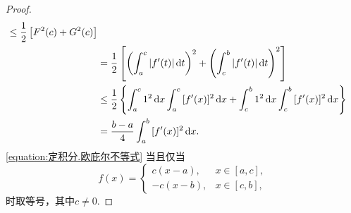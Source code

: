 \begin{theorem}[欧庇尔不等式]
\begin{proof}
\begin{align*}
	\leq \frac{1}{2} \left[
		F^2(c)
		+ G^2(c)
		\right] \\
	&= \frac{1}{2} \left[
		\left(\int_a^c{\abs{f'(t)}\dd{t}}\right)^2
		+\left(\int_c^b{\abs{f'(t)}\dd{t}}\right)^2
		\right] \\
	&\leq \frac{1}{2} \left\{
		\int_a^c{1^2 \dd{x}}
		\int_a^c{[f'(x)]^2 \dd{x}}
		+\int_c^b{1^2 \dd{x}}
		\int_c^b{[f'(x)]^2 \dd{x}}
		\right\} \\
	&= \frac{b-a}{4} \int_a^b{[f'(x)]^2 \dd{x}}.
\end{align*}
\cref{equation:定积分.欧庇尔不等式} 当且仅当\begin{equation*}
	f(x) = \left\{ \begin{array}{cl}
		c(x-a), & x\in\left[a,c\right], \\
		-c(x-b), & x\in\left[c,b\right],
	\end{array} \right.
\end{equation*}时取等号，其中\(c\neq0\).
\end{proof}
\end{theorem}

